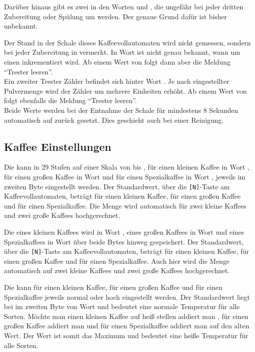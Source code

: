 Darüber hinaus gibt es zwei  in den Worten  und , die ungefähr bei jeder dritten Zubereitung oder Spülung um  werden.
Der genaue Grund dafür ist bisher unbekannt.

Der  Stand in der Schale dieses Kaffeevollautomaten wird nicht gemessen, sondern bei jeder Zubereitung in  vermerkt.
In Wort  ist nicht genau bekannt, wann um einen inkrementiert wird.
Ab einem Wert von  folgt dann aber die Meldung "`Trester leeren"'.\\
Ein zweiter Trester Zähler befindet sich hinter Wort .
Je nach eingestellter Pulvermenge wird der Zähler um mehrere Einheiten erhöht.
Ab einem Wert von  folgt ebenfalls die Meldung "`Trester leeren"'.\\
Beide Werte werden bei der Entnahme der Schale für mindestens 8 Sekunden automatisch auf  zurück gesetzt.
Dies geschieht auch bei einer Reinigung.

\subsection{Kaffee Einstellungen}
Die  kann in 29 Stufen auf einer Skala von  bis , für einen kleinen Kaffee in Wort , für einen großen Kaffee in Wort  und für einen Spezialkaffee in Wort , jeweils im zweiten Byte eingestellt werden.
Der Standardwert, über die \texttt{[N]}-Taste am Kaffeevollautomaten, beträgt  für einen kleinen Kaffee,  für einen großen Kaffee und  für einen Spezialkaffee.
Die Menge wird automatisch für zwei kleine Kaffees und zwei große Kaffees hochgerechnet.

Die  eines kleinen Kaffees wird in Wort , eines großen Kaffees in Wort  und eines Spezialkaffees in Wort  über beide Bytes hinweg gespeichert.
Der Standardwert, über die \texttt{[N]}-Taste am Kaffeevollautomaten, beträgt  für einen kleinen Kaffee,  für einen großen Kaffee und  für einen Spezialkaffee.
Auch hier wird die Menge automatisch auf zwei kleine Kaffees und zwei große Kaffees hochgerechnet.

Die  kann für einen kleinen Kaffee, für einen großen Kaffee und für einen Spezialkaffee jeweils normal oder hoch eingestellt werden.
Der Standardwert liegt bei  im zweiten Byte von Wort  und bedeutet eine normale Temperatur für alle Sorten.
Möchte man einen kleinen Kaffee auf heiß stellen addiert man , für einen großen Kaffee addiert man  und für einen Spezialkaffee addiert man  auf den alten Wert.
Der Wert  ist somit das Maximum und bedeutet eine heiße Temperatur für alle Sorten.

